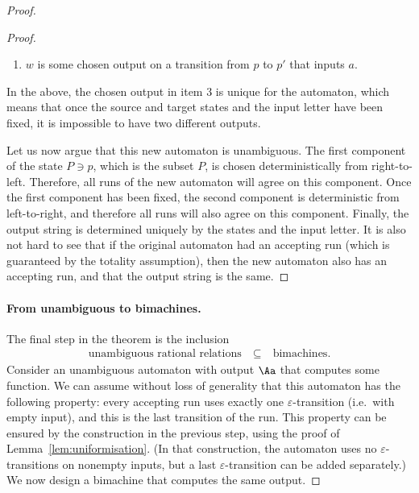 \begin{proof}
\begin{proof}
\begin{itemize}
\begin{enumerate}
            \item $w$ is some chosen output on a transition from $p$ to $p'$ that inputs $a$.
        \end{enumerate}
        In the above, the chosen output in item 3 is unique for the automaton, which means that once the source and target states and the input letter have been fixed, it is impossible to have two different outputs.
        \end{itemize}
    Let us now argue that this new automaton is unambiguous. The first component of the state $P \ni p$, which is the subset $P$, is chosen deterministically from right-to-left. Therefore, all runs of the new automaton will agree on this component. Once the first component has been fixed, the second component is deterministic from left-to-right, and therefore all runs will also agree on this component. Finally, the output string is determined uniquely by the states and the input letter. It is also not hard to see that if the original automaton had an accepting run (which is guaranteed by the totality assumption), then the new automaton also has an accepting run, and that the output string is the same.
\end{proof}

\paragraph*{From unambiguous to bimachines.}
The final step in the theorem is the inclusion
\begin{align*}
\text{unambiguous rational relations} \quad \subseteq \quad \text{bimachines.}
\end{align*}
Consider an unambiguous automaton with output $\Aa$ that computes some function. We can assume without loss of generality that this automaton has the following property: every accepting run uses exactly one $\varepsilon$-transition (i.e.~with empty input), and this is the last transition of the run. This property can be ensured by the construction in the previous step, using the proof of Lemma~\ref{lem:uniformisation}. (In that construction, the automaton uses no $\varepsilon$-transitions on nonempty inputs, but a last $\varepsilon$-transition can be added separately.)
We now design a bimachine that computes the same output.


\end{proof}
